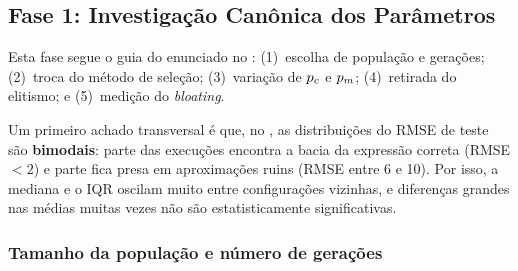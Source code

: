 \subsection{Fase 1: Investigação Canônica dos Parâmetros}
\label{sec:fase1}

Esta fase segue o guia do enunciado no : (1)~escolha de
população e gerações; (2)~troca do método de seleção; (3)~variação de $p_c$ e
$p_m$; (4)~retirada do elitismo; e (5)~medição do \emph{bloating}.

Um primeiro achado transversal é que, no , as distribuições do
RMSE de teste são \textbf{bimodais}: parte das execuções encontra a bacia da
expressão correta (RMSE $<2$) e parte fica presa em aproximações ruins
(RMSE entre 6 e 10). Por isso, a mediana e o IQR oscilam muito entre
configurações vizinhas, e diferenças grandes nas médias muitas vezes não são
estatisticamente significativas.

\subsubsection{Tamanho da população e número de gerações}
\label{sec:f1_pop}

\begin{table}[htbp]
  \centering
  \caption{População e gerações no  (30 execuções, torneio
           $k=2$). ``Sat.'' é a geração em que se atinge $95\%$ da melhoria
           total do erro de treino. Valores de $p$ (Mann--Whitney) em relação
           à configuração base (100/100).}
  \label{tab:f1_popgen}
  \small
\end{table}

